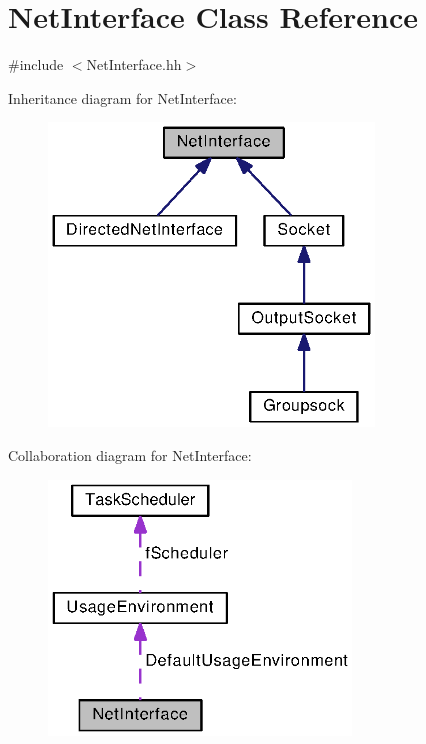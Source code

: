 \section{Net\+Interface Class Reference}
\label{classNetInterface}


{\ttfamily \#include $<$Net\+Interface.\+hh$>$}



Inheritance diagram for Net\+Interface\+:
\nopagebreak
\begin{figure}[H]
\begin{center}
\leavevmode
\includegraphics[width=245pt]{classNetInterface__inherit__graph}
\end{center}
\end{figure}


Collaboration diagram for Net\+Interface\+:
\nopagebreak
\begin{figure}[H]
\begin{center}
\leavevmode
\includegraphics[width=228pt]{classNetInterface__coll__graph}
\end{center}
\end{figure}
